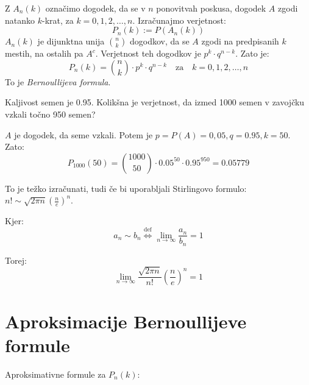 \documentclass[12pt]{book}
\def\n{\noindent}
\theoremstyle{definition}
\theoremstyle{plain}
\theoremstyle{plain}
\theoremstyle{plain}
\theoremstyle{remark}
\begin{document}
\n Z $A_n(k)$ označimo dogodek, da se v $n$ ponovitvah poskusa, dogodek $A$ zgodi natanko $k$-krat, za $k=0, 1, 2, \ldots , n$. Izračunajmo verjetnost:
$$
P_n(k):=P\left(A_n(k)\right)
$$
$A_n(k)$ je dijunktna unija $\binom{n}{k}$ dogodkov, da se $A$ zgodi na predpisanih $k$ mestih, na ostalih pa $A^c$. Verjetnost teh dogodkov je $p^k \cdot q^{n-k}$. Zato je: 
$$
P_n(k) = \binom{n}{k} \cdot p^k \cdot q^{n-k} \quad \text{za} \quad k=0, 1, 2, \ldots , n
$$
To je \emph{Bernoullijeva formula}.

\begin{zgled}
    Kaljivost semen je 0.95. Kolikšna je verjetnost, da izmed 1000 semen v zavojčku vzkali točno 950 semen?

    $A$ je dogodek, da seme vzkali. Potem je $p=P(A)=0,05, q=0.95, k=50$. Zato: 
    $$
    P_{1000}(50) = \binom{1000}{50}\cdot 0.05^{50} \cdot 0.95^{950} = 0.05779
    $$
\end{zgled}

\n To je težko izračunati, tudi če bi uporabljali Stirlingovo formulo: $n! \sim \sqrt{2 \pi n} \left(\frac{n}{e}\right)^n$.

Kjer: 
$$
a_n \sim b_n \overset{\text{def}}{\iff} \lim_{n \to \infty} \frac{a_n}{b_n} = 1
$$

Torej:
$$
\lim _{n \to \infty} \frac{\sqrt{2 \pi n}}{n !}\left(\frac{n}{e}\right)^n=1
$$

\section{Aproksimacije Bernoullijeve formule}

\n Aproksimativne formule za $P_n(k)$:
\end{document}
